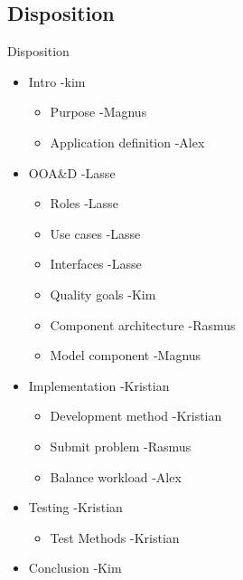 \subsection*{Disposition}
\begin{frame}{Disposition}
\begin{itemize}
	
	
	\item Intro -kim
	\begin{itemize}
		\item Purpose -Magnus 
		\item Application definition -Alex
	\end{itemize}
	\item OOA\&D -Lasse
	\begin{itemize}
		\item Roles -Lasse
		\item Use cases -Lasse
		\item Interfaces -Lasse
		\item Quality goals -Kim
		\item Component architecture -Rasmus
		\item Model component	-Magnus
	\end{itemize}
	\item Implementation -Kristian
	\begin{itemize}
		\item Development method -Kristian
		\item Submit problem -Rasmus
		\item Balance workload -Alex
	\end{itemize}	
	\item Testing -Kristian
	\begin{itemize}
		\item Test Methods -Kristian
	\end{itemize}
	\item Conclusion -Kim
\end{itemize}
\end{frame}